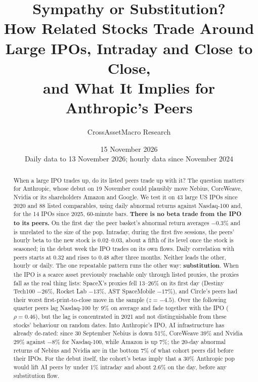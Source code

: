 \documentclass[11pt]{article}
\title{\vspace{-1.2em}\textbf{Sympathy or Substitution?}\\[0.3em]
\large How Related Stocks Trade Around Large IPOs, Intraday and Close to Close,\\ and What It Implies for Anthropic's Peers}
\author{CrossAssetMacro Research}
\date{15 November 2026\\[0.2em]\small Daily data to 13 November 2026; hourly data since November 2024}
\begin{document}
\maketitle
\thispagestyle{fancy}

\begin{abstract}
\noindent When a large IPO trades up, do its listed peers trade up with it? The question matters for Anthropic, whose debut on 19 November could plausibly move Nebius, CoreWeave, Nvidia or its shareholders Amazon and Google. We test it on 43 large US IPOs since 2020 and 88 listed comparables, using daily abnormal returns against Nasdaq-100 and, for the 14 IPOs since 2025, 60-minute bars. \textbf{There is no beta trade from the IPO to its peers.} On the first day the peer basket's abnormal return averages $-0.3\%$ and is unrelated to the size of the pop. Intraday, during the first five sessions, the peers' hourly beta to the new stock is 0.02--0.03, about a fifth of its level once the stock is seasoned; in the debut week the IPO trades on its own flows. Daily correlation with peers starts at 0.32 and rises to 0.48 after three months. Neither leads the other, hourly or daily. The one repeatable pattern runs the other way: \textbf{substitution}. When the IPO is a scarce asset previously reachable only through listed proxies, the proxies fall as the real thing lists: SpaceX's proxies fell 13--26\% on its first day (Destiny Tech100 $-26\%$, Rocket Lab $-13\%$, AST SpaceMobile $-17\%$), and Circle's peers had their worst first-print-to-close move in the sample ($z=-4.5$). Over the following quarter peers lag Nasdaq-100 by 9\% on average and fade together with the IPO ($\rho=0.46$), but the lag is concentrated in 2021 and not distinguishable from these stocks' behaviour on random dates. Into Anthropic's IPO, AI infrastructure has already de-rated: since 30 September Nebius is down 51\%, CoreWeave 39\% and Nvidia 29\% against $-8\%$ for Nasdaq-100, while Amazon is up 7\%; the 20-day abnormal returns of Nebius and Nvidia are in the bottom 7\% of what cohort peers did before their IPOs. For the debut itself, the cohort's betas imply that a 30\% Anthropic pop would lift AI peers by under 1\% intraday and about 2.6\% on the day, before any substitution flow.
\end{abstract}
\end{document}
